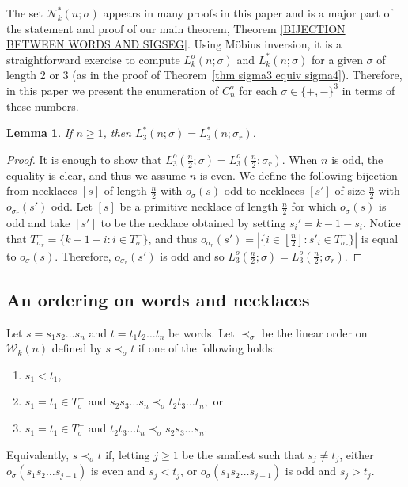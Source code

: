 \documentclass[12pt]{article}
\newcommand{\N}{\mathcal{N}}
\newcommand{\W}{\mathcal{W}}
\theoremstyle{plain}
\newtheorem{lemma}[theorem]{Lemma}
\theoremstyle{definition}
\begin{document}
The set $\N^*_k(n;\sigma)$ appears in many proofs in this paper and is a major part of the statement and proof of our main theorem, Theorem \ref{BIJECTION BETWEEN WORDS AND SIGSEG}. 
Using M\"obius inversion, it is a straightforward exercise to compute $L^o_k(n;\sigma)$ and $L^*_k(n;\sigma)$ for a given $\sigma$ of length 2 or 3 (as in the proof of Theorem~\ref{thm sigma3 equiv sigma4}). Therefore, in this paper we present the enumeration of $C_n^{\sigma}$ for each $\sigma\in\{+,-\}^3$ in terms of these numbers. 

\begin{lemma}\label{REVERSE WORD}
If $n\geq 1$, then $L_3^*(n; \sigma) = L_3^*(n; \sigma_r)$. 
\end{lemma}

\begin{proof}
It is enough to show that $L^o_3(\frac{n}{2}; \sigma) = L^o_3(\frac{n}{2}; \sigma_r)$. When $n$ is odd, the equality is clear, and thus we assume $n$ is even. We define the following bijection from necklaces $[s]$ of length $\frac{n}{2}$ with $o_\sigma(s)$ odd to necklaces $[s']$ of size $\frac{n}{2}$ with $o_{\sigma_r}(s')$ odd. Let $[s]$ be a primitive necklace of length $\frac{n}{2}$ for which $o_\sigma(s)$ is odd and take $[s']$ to be the necklace obtained by setting $s_i' = k-1-s_i$. Notice that $T_{\sigma_r}^- = \{k-1-i : i \in T_\sigma^-\}$, and thus $o_{\sigma_r}(s') = |\{i \in [\frac{n}{2}] : s'_i \in T^-_{\sigma_r} \}|$ is equal to $o_\sigma(s)$. Therefore, $o_{\sigma_r}(s')$ is odd and so $L^o_3(\frac{n}{2}; \sigma) = L^o_3(\frac{n}{2}; \sigma_r)$.
\end{proof}


\subsection{An ordering on words and necklaces}


Let $s= s_1s_2\ldots s_n$ and $t=t_1t_2\ldots t_n$ be words. Let $\prec_\sigma$ be the linear order on $\W_k(n)$ defined by $s\prec_\sigma t$ if one of the following holds:
\begin{enumerate}[(1)]
\item $s_1 < t_1$,
\item $s_1 = t_1 \in T^+_\sigma$ and $s_2s_3\ldots s_n\prec_\sigma t_2t_3\ldots t_n,$ or
\item $s_1 = t_1 \in T^-_\sigma$ and $t_2t_3\ldots t_n\prec_\sigma s_2s_3\ldots s_n.$
\end{enumerate}
Equivalently, $s\prec_\sigma t$ if, letting $j\ge1$ be the smallest such that $s_j \neq t_j$, either
$o_\sigma(s_{1}s_2\ldots s_{j-1})$ is even and $s_j<t_j$, or $o_\sigma(s_{1}s_2\ldots s_{j-1})$ is odd and $s_j>t_j$. 
\end{document}
